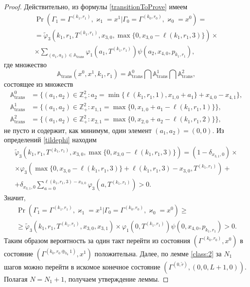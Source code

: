 \documentclass[a4paper,12pt,russian]{extarticle}
\begin{document}
\begin{proof}
Действительно, из формулы \eqref{transitionToProve} имеем
\begin{multline*}
\Pr (\Gamma_{1}=\Gamma^{(k_1,r_1)},\varkappa_{1}=x^1 | \Gamma_{0}=\Gamma^{(k_0,r_0)},\varkappa_0=x^0)=\\
=\widetilde{\varphi}_3(k_1,r_1,T^{(k_1,r_1)},x_{3,0},\max{\{0,x_{3,0} - \ell(k_1,r_1,3)\}})\times \\
\times
\sum_{(a_1,a_2)\in {\mathbb A}_{\mathrm{trans}}}\varphi_1(a_1,T^{(k_1,r_1)})  \psi(a_2,x_{4,0}, p_{k_1,r_1}),
\end{multline*}
где множество 
\begin{equation*}
{\mathbb A}_{\mathrm{trans}}(x^0,x^1,k_1,r_1) = {\mathbb A}_{\mathrm{trans}}^0 \bigcap {\mathbb A}_{\mathrm{trans}}^1\bigcap {\mathbb A}_{\mathrm{trans}}^2,
\end{equation*}
состоящее из множеств 
\begin{align*}
{\mathbb A}_{\mathrm{trans}}^0 &= \{(a_1,a_2) \in \mathbb{Z}_+^2 \colon a_2 = \min{\{\ell(k_1,r_1,1), x_{1,0}+a_1}\} +x_{4,0}- x_{4,1}\},\\
{\mathbb A}_{\mathrm{trans}}^1 &= \{(a_1,a_2) \in \mathbb{Z}_+^2 \colon x_{1,1}=\max{\{0,x_{1,0}+a_1-\ell(k_1,r_1,1)\}}\},\\
 {\mathbb A}_{\mathrm{trans}}^2 &= \{(a_1,a_2) \in \mathbb{Z}_+^2 \colon  x_{2,1} =\max{\{0,x_{2,0}+a_2-\ell(k_1,r_1,2)\}}\},
\end{align*}
не пусто и содержит, как минимум, один элемент $(a_1,a_2)=(0,0)$. Из определений \eqref{tildephi} находим
\begin{multline*}
\widetilde{\varphi}_3(k_1,r_1,T^{(k_1,r_1)},x_{3,0},\max{\{0,x_{3,0} - \ell(k_1,r_1,3)\}}) = (1-\delta_{x_{3,1},0}) \times \\\times\varphi_3(\max{\{0,x_{3,0} - \ell(k_1,r_1,3)\}} + \ell (k_1,r_1,3) - x_{3,0},T^{(k_1,r_1)} ) 
+\\+\delta_{x_{3,1},0} \sum_{a=0}^{\ell(k_1,r_1,3)-x_{3,0}}\varphi_3 (a,T^{(k_1,r_1)})>0.
\end{multline*}
Значит,
\begin{multline*}
\Pr (\Gamma_{1}=\Gamma^{(k_1,r_1)},\varkappa_{1}=x^1 | \Gamma_{0}=\Gamma^{(k_0,r_0)},\varkappa_0=x^0)\geqslant \\
\geqslant \widetilde{\varphi}_3(k_1,r_1,T^{(k_1,r_1)},x_{3,0},x_{3,1})
\times
\varphi_1(0,T^{(k_1,r_1)})  \psi(0,x_{4,0}, p_{k_1,r_1}) > 0.
\end{multline*}
Таким образом вероятность за один такт перейти из состояния $(\Gamma^{(k_0,r_0)}, x^0)$ в состояние $ (\Gamma^{(k_0,r_0\oplus_{k_0}1)}, x^1)$ положительна.
Далее, по лемме \eqref{class:2} за $N_1$ шагов можно перейти в искомое конечное состояние $(\Gamma^{(0,\tilde{r} )}, (0,0,L+1,0))$. Полагая $N=N_1+1$, получаем утверждение леммы.
\end{proof}
\end{document}
